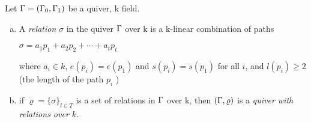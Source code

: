Let $\Gamma=(\Gamma_0,\Gamma_1)$ be a quiver, k field.\\
\begin{defin}
\begin{enumerate}[(a)]
	~\\ \item A \emph{relation} $\sigma$ in the quiver $\Gamma$ over k is a k-linear combination of paths
	\begin{center}
		$\sigma = a_1p_1 + a_2p_2+ \cdots + a_tp_t$\\
	\end{center}
	where $a_i\in k$, $e(p_i)=e(p_1)$ and $s(p_i)=s(p_1)$ for all $i$, and $l(p_i)\geq 2$ (the length of the path $p_i$ )
	\item if $\varrho = \{\sigma\}_{l \in T}$ is a set of relations in $\Gamma$ over k, then $(\Gamma,\varrho)$ is a \emph{quiver with relations over $k$.}  
\end{enumerate}
\end{defin}
